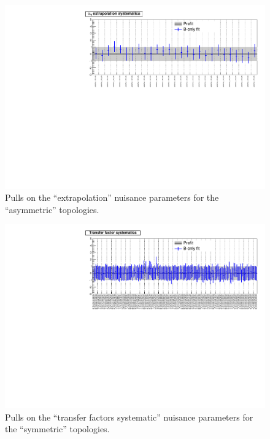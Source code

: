 \newpage
\begin{landscape}
\begin{figure}[h!]
\caption{Pulls on the ``\alt extrapolation'' nuisance parameters for the ``asymmetric'' topologies.\label{fig:nuisPull_alphaT_asym}}
    \includegraphics[width=\linewidth]{figures/postFitResults/nuisances/alphaT_asym_ALL_nuisances.pdf}
\end{figure}
\end{landscape}


\newpage
\begin{landscape}
\begin{figure}[h!]
\caption{Pulls on the ``transfer factors systematic'' nuisance parameters for the ``symmetric'' topologies.\label{fig:nuisPull_TF_sym}}
    \includegraphics[width=\linewidth]{figures/postFitResults/nuisances/TF_sym_ALL_nuisances.pdf}
\end{figure}
\end{landscape}



